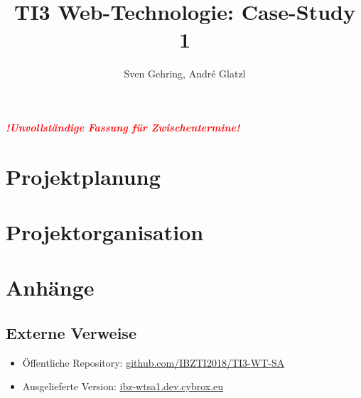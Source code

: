 \documentclass{article}
\begin{document}

\title{TI3 Web-Technologie: Case-Study 1}
\author{Sven Gehring, André Glatzl}
\date{}
\maketitle

\begin{abstract}

\end{abstract}

\vspace{3cm}
\begin{center}
  \textcolor{red}{\textbf{\emph{!Unvollständige Fassung für Zwischentermine!}}}
\end{center}

\clearpage
\tableofcontents
\clearpage

\section{Projektplanung}







\section{Projektorganisation}



\section{Anhänge}
\subsection{Externe Verweise}
\begin{itemize}
  \item Öffentliche Repository: \href{https://github.com/IBZTI2018/TI3-WT-SA}{github.com/IBZTI2018/TI3-WT-SA}
  \item Ausgelieferte Version: \href{https://ibz-wtsa1.dev.cybrox.eu/}{ibz-wtsa1.dev.cybrox.eu}
\end{itemize}
\end{document}
